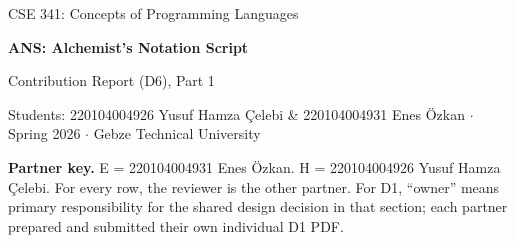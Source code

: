 \documentclass[10pt,a4paper]{article}
\begin{document}
\begin{center}
  {\footnotesize\color{anscaption}CSE 341: Concepts of Programming Languages\par}
  \vspace{2pt}
  {\Large\bfseries\sffamily ANS: Alchemist's Notation Script\par}
  \vspace{2pt}
  {\normalsize Contribution Report (D6), Part 1\par}
  \vspace{4pt}
  {\footnotesize\color{anscaption}
    Students: 220104004926 Yusuf Hamza Çelebi \& 220104004931 Enes Özkan
    \(\cdot\) Spring 2026 \(\cdot\) Gebze Technical University\par}
\end{center}
\vspace{3pt}

\textbf{Partner key.}
E = 220104004931 Enes Özkan.
H = 220104004926 Yusuf Hamza Çelebi.
For every row, the reviewer is the other partner. For D1, ``owner'' means primary responsibility for the shared design decision in that section; each partner prepared and submitted their own individual D1 PDF.
\end{document}
